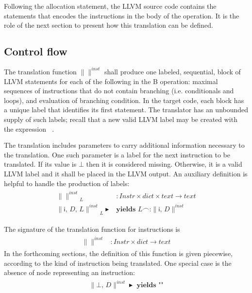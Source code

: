 \documentclass{article}
\newcommand{\trad}[2]{\ensuremath{\lVert \textsf{#1} \rVert^{\textit{#2}}}}
\DeclareMathOperator{\conc}{\smallfrown}
\DeclareMathOperator{\isdef}{\blacktriangleright}
\DeclareMathOperator{\name}{\mathcal{L}()}
\begin{document}
Following the allocation statement, the LLVM source code contains the
statements that encodes the instructions in the body of the
operation. It is the role of the next section to present how this
translation can be defined.

\subsection{Control flow}
\label{sec:trad-instr}

The translation function $\trad{}{inst}$ shall produce one labeled,
sequential, block of LLVM statements for each of the following in the
B operation: maximal sequences of instructions that do not contain
branching (i.e. conditionals and loops), and evaluation of branching
condition. In the target code, each block has a unique label that
identifies its first statement. The translator has an unbounded supply
of such labels; recall that a new valid LLVM label may be created with
the expression $\name$.

The translation includes parameters to carry additional information
necessary to the translation. One such parameter is a label for the
next instruction to be translated. If its value is $\bot$ then it is
considered missing. Otherwise, it is a valid LLVM label and it shall
be placed in the LLVM output. An auxiliary definition is helpful to
handle the production of labels:
\begin{align*}
\begin{split}
  \trad{}{inst}_{L} &: Instr \times dict \times text \rightarrow text \\
  \trad{i, $D$, $L$}{inst}_L \isdef 
  & \textbf{yields } L \conc \texttt{:} \trad{i, $D$}{inst}  
\end{split}
\end{align*}

The signature of the translation function for instructions is
  \begin{align*}
    \begin{split}
      \trad{}{inst} &: Instr \times dict \rightarrow text
    \end{split}
  \end{align*}
In the forthcoming sections, the definition of this function is given
piecewise, according to the kind of instruction being translated. One
special case is the absence of node representing an instruction:
\begin{align}
  \begin{split}
    \trad{$\bot$, $D$}{inst} \isdef \textbf{ yields } \texttt{""}
  \end{split}
\end{align}
 
\end{document}
